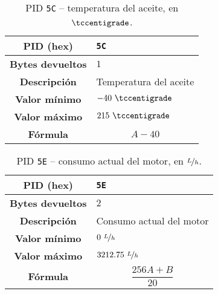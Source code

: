 \begin{table}[H]
  \centering
  \begin{tabularx}{\textwidth}{|c|X|}
    \hline
    \textbf{PID (hex)}       & \texttt{5C}                    \\
    \hline
    \textbf{Bytes devueltos} & $1$                            \\
    \hline
    \textbf{Descripción}     & Temperatura del aceite \\
    \hline
    \textbf{Valor mínimo}    & $-40~\tccentigrade$                          \\
    \hline
    \textbf{Valor máximo}    & $215~\tccentigrade$                        \\
    \hline
    \textbf{Fórmula}         &                                %
    \begin{equation*}
      A - 40
    \end{equation*}                                 \\
    \hline
  \end{tabularx}
  \caption{\ac{PID} \texttt{5C} -- temperatura del aceite, en $\tccentigrade$.}
\end{table}

\begin{table}[H]
  \centering
  \begin{tabularx}{\textwidth}{|c|X|}
    \hline
    \textbf{PID (hex)}       & \texttt{5E}                    \\
    \hline
    \textbf{Bytes devueltos} & $2$                            \\
    \hline
    \textbf{Descripción}     & Consumo actual del motor \\
    \hline
    \textbf{Valor mínimo}    & $0~\nicefrac{L}{h}$                          \\
    \hline
    \textbf{Valor máximo}    & $3212.75~\nicefrac{L}{h}$                        \\
    \hline
    \textbf{Fórmula}         &                                %
    \begin{equation*}
      \frac{256A + B}{20}
    \end{equation*}                                 \\
    \hline
  \end{tabularx}
  \caption{\ac{PID} \texttt{5E} -- consumo actual del motor, en $\nicefrac{L}{h}$.}
\end{table}

